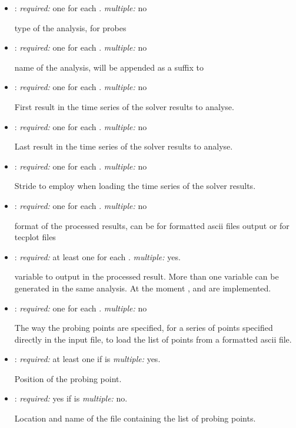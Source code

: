 \begin{itemize}
\item {}: \textit{required:} one for each . 
\textit{multiple:} no

type of the analysis,  for probes

\item {}: \textit{required:} one for each . 
\textit{multiple:} no

name of the analysis, will be appended as a suffix to 

\item {}: \textit{required:} one for each . 
\textit{multiple:} no

First result in the time series of the solver results to analyse.

\item {}: \textit{required:} one for each . 
\textit{multiple:} no

Last result in the time series of the solver results to analyse.

\item {}: \textit{required:} one for each . 
\textit{multiple:} no

Stride to employ when loading the time series of the solver results. 

\item {}: \textit{required:} one for each . 
\textit{multiple:} no

format of the processed results, can be  for formatted ascii files 
output or  for tecplot  files

\item {}: \textit{required:} at least one for each . 
\textit{multiple:} yes.

variable to output in the processed result. More than one variable can be generated in the same analysis. 
At the moment ,  and  are implemented.

\item {}: \textit{required:} one for each . \textit{multiple:} no

The way the probing points are specified,  for a series of 
points specified directly in the input file,  to load the list 
of points from a formatted ascii file.

\item {}: \textit{required:} at least one if  is  
\textit{multiple:} yes.

Position of the probing point.

\item {}: \textit{required:} yes if  is  \textit{multiple:} no.

Location and name of the file containing the list of probing points.

\end{itemize}

